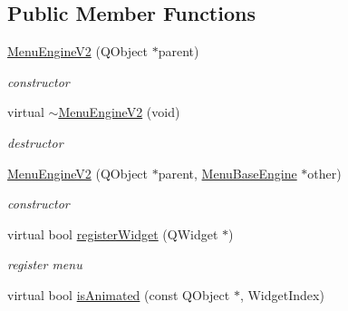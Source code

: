 \subsection*{Public Member Functions}
\begin{DoxyCompactItemize}
\item 
\mbox{\label{class_menu_engine_v2_af4a8003d29b0a752b55a153881d6b242}} 
\hyperlink{class_menu_engine_v2_af4a8003d29b0a752b55a153881d6b242}{Menu\+Engine\+V2} (Q\+Object $\ast$parent)
\begin{DoxyCompactList}\small\item\em constructor \end{DoxyCompactList}\item 
\mbox{\label{class_menu_engine_v2_a42c72ce22078a1056acf85c113a3d2a8}} 
virtual \hyperlink{class_menu_engine_v2_a42c72ce22078a1056acf85c113a3d2a8}{$\sim$\+Menu\+Engine\+V2} (void)
\begin{DoxyCompactList}\small\item\em destructor \end{DoxyCompactList}\item 
\mbox{\label{class_menu_engine_v2_ae22868aece22d1ee73eb7ad3d77e307e}} 
\hyperlink{class_menu_engine_v2_ae22868aece22d1ee73eb7ad3d77e307e}{Menu\+Engine\+V2} (Q\+Object $\ast$parent, \hyperlink{class_menu_base_engine}{Menu\+Base\+Engine} $\ast$other)
\begin{DoxyCompactList}\small\item\em constructor \end{DoxyCompactList}\item 
\mbox{\label{class_menu_engine_v2_ad655696ec242d32c9dc6a9428a6f2e2b}} 
virtual bool \hyperlink{class_menu_engine_v2_ad655696ec242d32c9dc6a9428a6f2e2b}{register\+Widget} (Q\+Widget $\ast$)
\begin{DoxyCompactList}\small\item\em register menu \end{DoxyCompactList}\item 
\mbox{\label{class_menu_engine_v2_a43f05efa223ba79b0a5d221194469712}} 
virtual bool \hyperlink{class_menu_engine_v2_a43f05efa223ba79b0a5d221194469712}{is\+Animated} (const Q\+Object $\ast$, Widget\+Index)

\end{DoxyCompactItemize}
